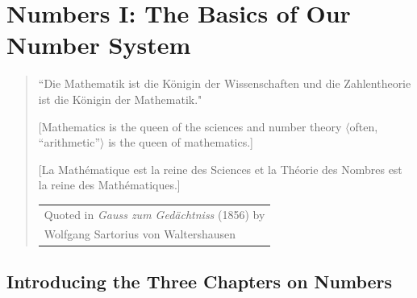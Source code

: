 
\chapter{Numbers I:
The Basics of Our Number System}
\label{ch:numbers-numerals}

\begin{quote}
``Die Mathematik ist die K\"{o}nigin der Wissenschaften und die Zahlentheorie ist die K\"{o}nigin der Mathematik."

\smallskip

[Mathematics is the queen of the sciences and number theory $\langle$often, ``arithmetic''$\rangle$ is the queen of mathematics.]
  
[La Math\'ematique est la reine des Sciences et la Th\'eorie des Nombres est la reine des Math\'ematiques.]

\hfill
\begin{tabular}{l}
Quoted in {\it Gauss zum Gedächtniss} (1856) by \\
Wolfgang Sartorius von Waltershausen 
\end{tabular}
\end{quote}


\section{Introducing the Three Chapters on Numbers}

